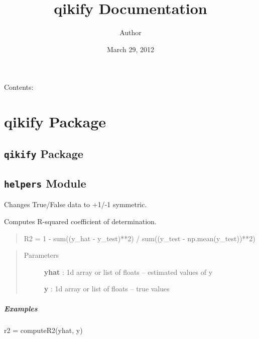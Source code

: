 \documentclass[letterpaper,10pt,english]{sphinxmanual}
\title{qikify Documentation}
\date{March 29, 2012}
\author{Author}
\begin{document}
\maketitle
\tableofcontents
{}\label{index::doc}


Contents:


\chapter{qikify Package}
\label{qikify:qikify-package}\label{qikify:welcome-to-qikify-s-documentation}\label{qikify::doc}

\section{\texttt{qikify} Package}
\label{qikify:id1}\label{qikify:module-qikify.__init__}

\section{\texttt{helpers} Module}
\label{qikify:module-qikify.helpers}\label{qikify:helpers-module}

\begin{fulllineitems}
\label{qikify:qikify.helpers.bool2symmetric}
Changes True/False data to +1/-1 symmetric.

\end{fulllineitems}


\begin{fulllineitems}
\label{qikify:qikify.helpers.computeR2}
Computes R-squared coefficient of determination.
\begin{quote}

R2 = 1 - sum((y\_hat - y\_test)**2) / sum((y\_test - np.mean(y\_test))**2)
\end{quote}
\begin{quote}\begin{description}
\item[{Parameters }] \leavevmode
\textbf{yhat} : 1d array or list of floats -- estimated values of y

\textbf{y} : 1d array or list of floats -- true values

\end{description}\end{quote}
\paragraph{Examples}

r2 = computeR2(yhat, y)

\end{fulllineitems}
\end{document}
